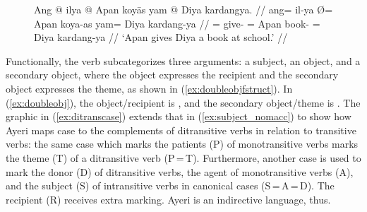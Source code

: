 \begin{figure}
\pex\label{ex:doubleobj}
\a\label{ex:doubleobj_1}\begingl
	\gla Ang @ ilya {} @ Apan koyās yam @ Diya kardangya. //
	\glb ang= il-ya Ø= Apan koya-as yam= Diya kardang-ya //
	\glc \AgtT{}= give-\TsgM{} \Top{}= Apan book-\Parg{} \Dat{}= Diya
	kardang-ya //
	\glft `Apan gives Diya a book at school.' //
\endgl

\a\label{ex:doubleobj_2}\ljudge*%
\xe
\end{figure}

Functionally, the verb subcategorizes three arguments: a subject, an object,
and a secondary object, where the object expresses the recipient and the
secondary object expresses the theme, as shown in (\ref{ex:doubleobjfstruct}).
In (\ref{ex:doubleobj}), the object/recipient is , and the
secondary object/theme is . The graphic in
(\ref{ex:ditranscase}) extends that in (\ref{ex:subject_nomacc}) to show how
Ayeri maps case to the complements of ditransitive verbs in relation to
transitive verbs: the same case which marks the patients (P) of monotransitive
verbs marks the theme (T) of a ditransitive verb (P\,=\,T). Furthermore,
another case is used to mark the donor (D) of ditransitive verbs, the agent of
monotransitive verbs (A), and the subject (S) of intransitive verbs in
canonical cases (S\,=\,A\,=\,D). The recipient (R) receives extra marking.
Ayeri is an indirective language, thus.


